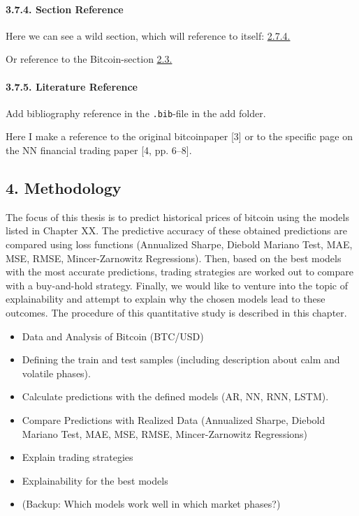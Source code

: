 \documentclass[
]{article}
\providecommand{\tightlist}{%
  \setlength{\itemsep}{0pt}\setlength{\parskip}{0pt}}
\begin{document}
\hypertarget{sec-ref}{%
\paragraph{3.7.4. Section Reference}\label{sec-ref}}

Here we can see a wild section, which will reference to itself:
\protect\hyperlink{sec-ref}{2.7.4.}

Or reference to the Bitcoin-section \protect\hyperlink{bitcoin}{2.3.}

\newpage

\hypertarget{literature-reference}{%
\paragraph{3.7.5. Literature Reference}\label{literature-reference}}

Add bibliography reference in the \texttt{.bib}-file in the add folder.

Here I make a reference to the original bitcoinpaper {[}3{]} or to the
specific page on the NN financial trading paper {[}4, pp. 6--8{]}.

\newpage

\hypertarget{methodology}{%
\subsection{4. Methodology}\label{methodology}}

The focus of this thesis is to predict historical prices of bitcoin
using the models listed in Chapter XX. The predictive accuracy of these
obtained predictions are compared using loss functions (Annualized
Sharpe, Diebold Mariano Test, MAE, MSE, RMSE, Mincer-Zarnowitz
Regressions). Then, based on the best models with the most accurate
predictions, trading strategies are worked out to compare with a
buy-and-hold strategy. Finally, we would like to venture into the topic
of explainability and attempt to explain why the chosen models lead to
these outcomes. The procedure of this quantitative study is described in
this chapter.

\begin{itemize}
\tightlist
\item
  Data and Analysis of Bitcoin (BTC/USD)
\item
  Defining the train and test samples (including description about calm
  and volatile phases).
\item
  Calculate predictions with the defined models (AR, NN, RNN, LSTM).
\item
  Compare Predictions with Realized Data (Annualized Sharpe, Diebold
  Mariano Test, MAE, MSE, RMSE, Mincer-Zarnowitz Regressions)
\item
  Explain trading strategies
\item
  Explainability for the best models
\item
  (Backup: Which models work well in which market phases?)
\end{itemize}
\end{document}
